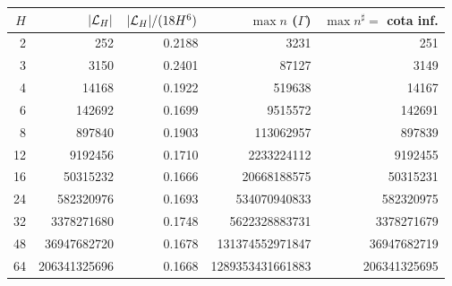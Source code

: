 \begin{tabular}{rrrrr}
\toprule
$H$ & $|\mathcal{L}_H|$ & $|\mathcal{L}_H|/(18H^6)$ & $\max n$ ($\Gamma$) & $\max n^\sharp=$ cota inf.\\
\midrule
2 & 252 & 0.2188 & 3231 & 251\\
3 & 3150 & 0.2401 & 87127 & 3149\\
4 & 14168 & 0.1922 & 519638 & 14167\\
6 & 142692 & 0.1699 & 9515572 & 142691\\
8 & 897840 & 0.1903 & 113062957 & 897839\\
12 & 9192456 & 0.1710 & 2233224112 & 9192455\\
16 & 50315232 & 0.1666 & 20668188575 & 50315231\\
24 & 582320976 & 0.1693 & 534070940833 & 582320975\\
32 & 3378271680 & 0.1748 & 5622328883731 & 3378271679\\
48 & 36947682720 & 0.1678 & 131374552971847 & 36947682719\\
64 & 206341325696 & 0.1668 & 1289353431661883 & 206341325695\\
\bottomrule
\end{tabular}
